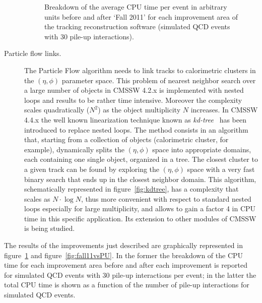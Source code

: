 \begin{description}
\begin{figure}[b]
\begin{minipage}[b]{0.38\textwidth}\caption{\label{fig:fall11}Breakdown
    of the average CPU time per event in arbitrary units before and after 
  `Fall 2011' for each improvement area of the tracking reconstruction
  software (simulated QCD events with 30 pile-up interactions).}
\end{minipage}
\end{figure}
\item[Particle flow links.] The Particle Flow algorithm needs to link
  tracks to calorimetric clusters in the $(\eta, \phi)$ parameter space. This
  problem of nearest neighbor search 
  over a large number of objects in CMSSW 4.2.x is implemented with
  nested loops and results to be rather time intensive. Moreover the
  complexity scales quadratically ($N^2$) as the object multiplicity
  $N$ increases. In CMSSW 4.4.x the well known linearization technique
  known as {\em kd-tree}~\cite{kdtree} has been introduced to replace nested
  loops. The method consists in an algorithm that, starting from a
  collection of objects (calorimetric cluster, for example),
  dynamically splits the $(\eta, \phi)$ space into appropriate domains,
  each containing one single object, organized in a tree. The closest
  cluster to a given track can be found by 
  exploring the $(\eta, \phi)$ space with a very fast binary search
  that ends up in the closest neighbor domain. This algorithm,
  schematically represented in figure~\ref{fig:kdtree}, has a complexity
  that scales as $N\cdot\log N$, thus more convenient with respect to
  standard nested loops especially for large multiplicity, and allows to
  gain a factor 4 in CPU time in this specific application. Its
  extension to other modules of CMSSW is being studied.
\end{description}
 The results of the improvements just described are graphically
represented in figure~\ref{fig:fall11} and figure~\ref{fig:fall11vsPU}. In the
former the breakdown of the CPU time for each improvement area before
and after each improvement is reported for simulated QCD events with
30 pile-up interactions per event; in the latter the total CPU time is
shown as a function of the number of pile-up interactions for
simulated QCD events.

